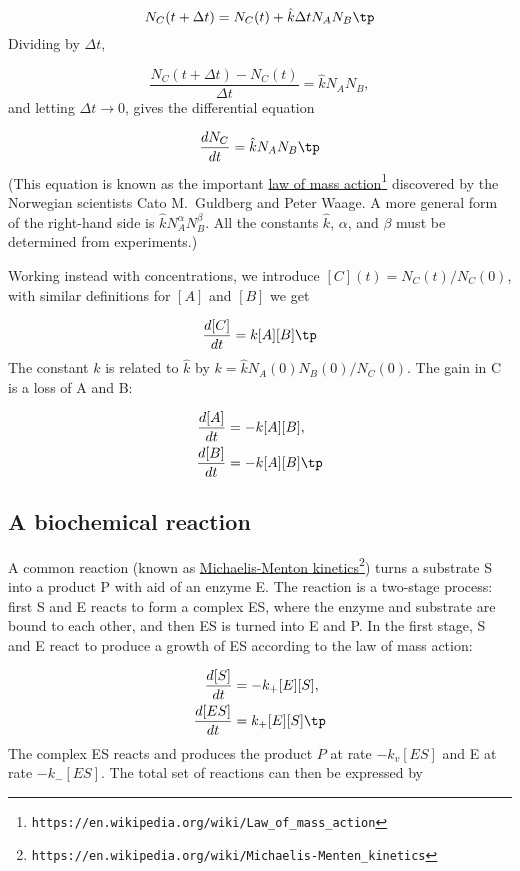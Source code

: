 \documentclass[graybox,sectrefs,envcountresetchap,open=right,final]{svmonodo}
\begin{document}
\[ N_C(t+\Delta t) = N_C(t) + \hat k\Delta t N_AN_B\tp\]
Dividing by $\Delta t$,

\[ \frac{N_C(t+\Delta t) - N_C(t)}{\Delta t} = \hat k N_AN_B,\]
and letting $\Delta t\rightarrow 0$, gives the differential equation

\[ \frac{dN_C}{dt} = \hat k N_AN_B\tp\]
(This equation is known as the important \href{{https://en.wikipedia.org/wiki/Law_of_mass_action}}{law of mass action}\footnote{\texttt{https://en.wikipedia.org/wiki/Law\_of\_mass\_action}} discovered by
the Norwegian scientists Cato M.~Guldberg and Peter Waage.
A more general form of the right-hand side is $\hat kN_A^{\alpha}N_B^{\beta}$.
All the constants $\hat k$, $\alpha$, and $\beta$ must be determined from
experiments.)

Working instead with concentrations, we introduce $[C](t)=N_C(t)/N_C(0)$,
with similar definitions for $[A]$ and $[B]$ we get

\begin{equation}
\frac{d[C]}{dt} = k [A][B]\tp
\end{equation}
The constant $k$ is related to $\hat k$ by $k = \hat k N_A(0)N_B(0)/N_C(0)$.
The gain in C is a loss of A and B:

\begin{align}
\frac{d[A]}{dt} &= -k[A][B],\\ 
\frac{d[B]}{dt} &= -k[A][B]\tp
\end{align}

\subsection{A biochemical reaction}

A common reaction (known as \href{{https://en.wikipedia.org/wiki/Michaelis-Menten_kinetics}}{Michaelis-Menton kinetics}\footnote{\texttt{https://en.wikipedia.org/wiki/Michaelis-Menten\_kinetics}}) turns a substrate S into
a product P with aid of an enzyme E. The reaction is a two-stage process:
first S and E reacts to form a complex ES, where the enzyme and substrate
are bound to each other, and then ES is turned into E and P.
In the first stage, S and E react to produce a growth of ES according
to the law of mass action:

\begin{align*}
\frac{d[S]}{dt} &= - k_+[E][S],\\ 
\frac{d[ES]}{dt} &= k_+[E][S]\tp\\ 
\end{align*}
The complex ES reacts and produces the product $P$ at rate
$-k_{v}[ES]$ and E at rate $-k_-[ES]$. The total set of reactions can
then be expressed by
\end{document}
